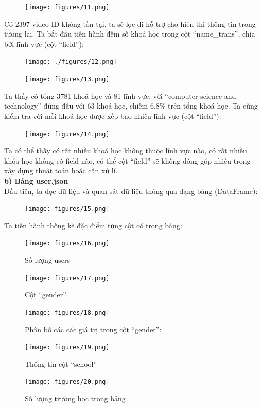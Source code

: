 \begin{figure}[H]
    \centering
    \texttt{[image: figures/11.png]}
\end{figure}
Có 2397 video ID không tồn tại, ta sẽ lọc đi hỗ trợ cho hiển thi thông tin trong tương lai.
Ta bắt đầu tiến hành đếm số khoá học trong cột “name\_trans”, chia bởi lĩnh vực (cột “field”):\\
\begin{figure}[H]
    \centering
    \texttt{[image: ./figures/12.png]}
\end{figure}
\newpage
\begin{figure}[H]
    \centering
    \texttt{[image: figures/13.png]}
\end{figure}
Ta thấy có tổng 3781 khoá học và 81 lĩnh vực, với “computer science and technology” đứng đầu với 63 khoá học, chiếm 6.8\% trên tổng khoá học. Ta cũng kiểm tra với mỗi khoá học được xếp bao nhiêu lĩnh vực (cột “field”):
\begin{figure}[H]
    \centering
    \texttt{[image: figures/14.png]}
\end{figure}
Ta có thể thấy có rất nhiều khoá học không thuộc lĩnh vực nào, có rất nhiều khóa học không có field nào, có thể cột “field” sẽ không đóng góp nhiều trong xây dựng thuật toán hoặc cần xử lí.\\
\textbf{b) Bảng user.json}\\
Đầu tiên, ta đọc dữ liệu và quan sát dữ liệu thông qua dạng bảng (DataFrame):
\begin{figure}[H]
    \centering
    \texttt{[image: figures/15.png]}
\end{figure}
\newpage
Ta tiến hành thống kê đặc điểm từng cột có trong bảng:
\begin{figure}[H]
    \centering
    \texttt{[image: figures/16.png]}
    \caption{Số lượng users}
\end{figure}
\begin{figure}[H]
    \centering
    \texttt{[image: figures/17.png]}
    \caption{Cột “gender”}
\end{figure}
\begin{figure}[H]
    \centering
    \texttt{[image: figures/18.png]}
    \caption{Phân bố các các giá trị trong cột “gender”:}
\end{figure}
\newpage
\begin{figure}[H]
    \centering
    \texttt{[image: figures/19.png]}
    \caption{Thông tin cột “school”}
\end{figure}
\begin{figure}[H]
    \centering
    \texttt{[image: figures/20.png]}
    \caption{Số lượng trường học trong bảng}
\end{figure}

